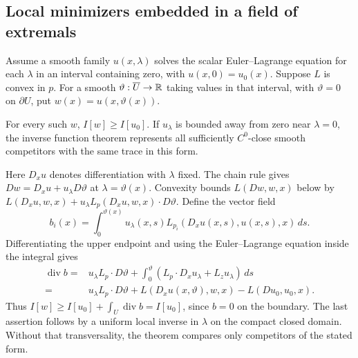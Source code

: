 \subsection{Local minimizers embedded in a field of extremals}
Assume a smooth family $u(x,\lambda)$ solves the scalar Euler--Lagrange
equation for each $\lambda$ in an interval containing zero, with
$u(x,0)=u_0(x)$. Suppose $L$ is convex in $p$. For a smooth
$\vartheta:\overline U\to\mathbb{R}$ taking values in that interval, with
$\vartheta=0$ on $\partial U$, put $w(x)=u(x,\vartheta(x))$.
\Needspace{55mm}
\begin{theorem}
For every such $w$, $I[w]\geq I[u_0]$.
If $u_\lambda$ is bounded away from zero near $\lambda=0$, the inverse
function theorem represents all sufficiently $C^0$-close smooth competitors
with the same trace in this form.
\end{theorem}
\begin{expandedproof}
Here $D_xu$ denotes differentiation with $\lambda$ fixed. The chain rule
gives $Dw=D_xu+u_\lambda D\vartheta$ at $\lambda=\vartheta(x)$.
Convexity bounds $L(Dw,w,x)$ below by
$L(D_xu,w,x)+u_\lambda L_p(D_xu,w,x)\cdot D\vartheta$.
Define the vector field
\[
 b_i(x)=\int_0^{\vartheta(x)}
 u_\lambda(x,s)L_{p_i}(D_xu(x,s),u(x,s),x)\,ds.
\]
Differentiating the upper endpoint and using the Euler--Lagrange equation
inside the integral gives
\[
 \begin{split}
 \operatorname{div}b={}&u_\lambda L_p\cdot D\vartheta
 +\int_0^{\vartheta}(L_p\cdot D_xu_\lambda+L_z u_\lambda)\,ds\\
 ={}&u_\lambda L_p\cdot D\vartheta
 +L(D_xu(x,\vartheta),w,x)-L(Du_0,u_0,x).
 \end{split}
\]
Thus $I[w]\geq I[u_0]+\int_U\operatorname{div}b=I[u_0]$, since
$b=0$ on the boundary. The last assertion follows by a uniform local
inverse in $\lambda$ on the compact closed domain. Without that
transversality, the theorem compares only competitors of the stated form.
\end{expandedproof}
